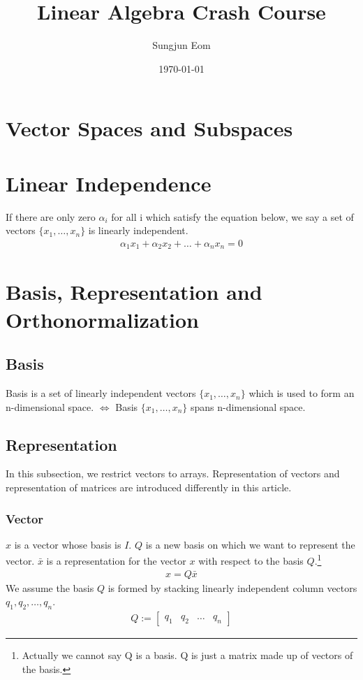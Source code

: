 \documentclass{article}
\title{Linear Algebra Crash Course}
\author{Sungjun Eom}
\date{\today}
\begin{document}
\maketitle

\tableofcontents

\newpage

\section{Vector Spaces and Subspaces}

\section{Linear Independence}
If there are only zero \(\alpha_i\) for all i which satisfy the equation below, we say a set of vectors \(\{x_1, \dots, x_n\}\) is linearly independent.
\begin{align}
\alpha_1 x_1+\alpha_2 x_2 + \dots + \alpha_n x_n = 0
\end{align}


\section{Basis, Representation and Orthonormalization}


\subsection{Basis}
Basis is a set of linearly independent vectors \(\{x_1, \dots, x_n\}\) which is used to form an n-dimensional space. \(\iff\) Basis \(\{x_1, \dots, x_n\}\) spans n-dimensional space.

\subsection{Representation}
In this subsection, we restrict vectors to arrays. Representation of vectors and representation of matrices are introduced differently in this article.


\subsubsection{Vector}
\(x\) is a vector whose basis is \(I\). \(Q\) is a new basis on which we want to represent the vector. \(\bar{x}\) is a representation for the vector \(x\) with respect to the basis \(Q\).\footnote{Actually we cannot say Q is a basis. Q is just a matrix made up of vectors of the basis.}
\begin{align}
x = Q\bar{x}
\end{align}
We assume the basis \(Q\) is formed by stacking linearly independent column vectors \(q_1, q_2,\dots,q_n\).
\begin{align*}
Q := \left[ \begin{matrix} q_1 & q_2 & \dots & q_n \end{matrix}\right]
\end{align*}
\end{document}
